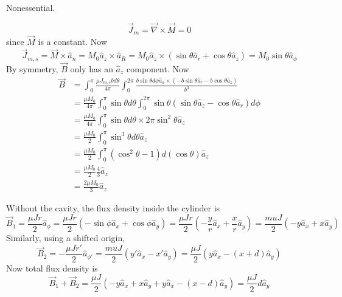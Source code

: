 \documentclass[answers]{exam}
\begin{document}
\begin{questions}
\begin{solution}
    Nonessential.
\end{solution}


\begin{solution}
    $$\vec J_m = \vec\nabla \times \vec M = 0$$
    since $\vec M$ is a constant. Now
    $$\vec J_{m,s} = \vec M \times \hat a_n = M_0\hat a_z \times \hat a_R = M_0\hat a_z \times (\sin\theta\hat a_r + \cos\theta \hat a_z) = M_0\sin\theta \hat a_\phi$$
    By symmetry, $\vec B$ only has an $\hat a_z$ component. Now
    \begin{align*}
        \vec B &= \int_0^\pi \frac{\mu J_{m,s}bd\theta}{4\pi} \int_0^{2\pi} \frac{b\sin\theta d\phi\hat a_\phi \times (-b\sin\theta\hat a_r -b\cos\theta\hat a_z)}{b^3} \\
               &= \frac{\mu M_0}{4\pi} \int_0^\pi \sin\theta d\theta \int_0^{2\pi} \sin\theta(\sin\theta\hat a_z - \cos\theta\hat a_r)d\phi \\
               &= \frac{\mu M_0}{4\pi} \int_0^\pi \sin\theta d\theta \times 2\pi\sin^2\theta \hat a_z \\
               &= \frac{\mu M_0}{2} \int_0^\pi \sin^3\theta d\theta \hat a_z \\
               &= \frac{\mu M_0}{2} \int_0^\pi (\cos^2\theta-1)d(\cos\theta) \hat a_z \\
               &= \frac{\mu M_0}{2} \frac{4}{3} \hat a_z \\
               &= \frac{2\mu M_0}{3} \hat a_z
    \end{align*}
\end{solution}


\begin{solution}
    Without the cavity, the flux density inside the cylinder is
    $$\vec B_1 = \frac{\mu Jr}{2} \hat a_\phi = \frac{\mu Jr}{2} (-\sin\phi\hat a_x + \cos\phi\hat a_y) = \frac{\mu Jr}{2} \left(-\frac{y}{r}\hat a_x + \frac{x}{r}\hat a_y\right) = \frac{mu J}{2} (-y\hat a_x + x\hat a_y)$$
    Similarly, using a shifted origin,
    $$\vec B_2 = -\frac{\mu Jr'}{2} \hat a_{\phi'} = \frac{mu J}{2} (y'\hat a_x - x'\hat a_y) = \frac{\mu J}{2} (y\hat a_x - (x+d)\hat a_y)$$
    Now total flux density is
    $$\vec B_1 + \vec B_2 = \frac{\mu J}{2} (-y\hat a_x + x\hat a_y + y\hat a_x - (x-d)\hat a_y) = \frac{\mu J}{2} d\hat a_y$$
\end{solution}

\end{questions}
\end{document}
